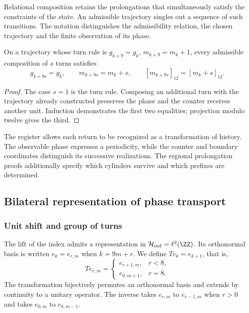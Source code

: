 Relational composition retains the prolongations that simultaneously
satisfy the constraints of the state. An admissible trajectory
singles out a sequence of such transitions. The notation distinguishes
the admissibility relation, the chosen trajectory and the finite
observation of its phase.

\begin{proposicion}
\label{prop:cal-memoria}
On a trajectory whose turn rule is
$g_{k+9}=g_k$, $m_{k+9}=m_k+1$, every admissible composition of $s$
turns satisfies
\[
 g_{k+9s}=g_k,\qquad m_{k+9s}=m_k+s,
 \qquad [m_{k+9s}]_{12}=[m_k+s]_{12}.
\]
\end{proposicion}
\begin{proof}
The case $s=1$ is the turn rule. Composing an additional turn
with the trajectory already constructed preserves the phase and the counter
receives another unit. Induction demonstrates the first two equalities;
projection modulo twelve gives the third.
\end{proof}

The register allows each return to be recognized as a transformation of
history. The observable phase expresses a periodicity, while
the counter and boundary coordinates distinguish its successive
realizations. The regional prolongation proofs additionally specify
which cylinders survive and which prefixes are determined.

\subsection{Bilateral representation of phase transport}

\subsubsection{Unit shift and group of turns}

The lift of the index admits a representation in
$\mathcal H_{\rm ind}=\ell^2(\ZZ)$. Its orthonormal basis is written
$e_k=e_{r,m}$ when $k=9m+r$. We define $Te_k=e_{k+1}$, that is,
\[
 Te_{r,m}=\begin{cases}
 e_{r+1,m},&r<8,\\e_{0,m+1},&r=8.
 \end{cases}
\]
The transformation bijectively permutes an orthonormal basis and
extends by continuity to a unitary operator. The inverse takes
$e_{r,m}$ to $e_{r-1,m}$ when $r>0$ and takes $e_{0,m}$ to
$e_{8,m-1}$.

